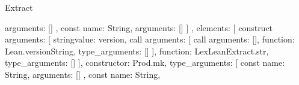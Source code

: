 \begin{lexlean}{Extract}
\begin{toolingmodule}
{{{{{{{{{{{{{{{{{{{{{{                                                                      arguments: []
                                                                    },
                                                                    const{
                                                                      name: String,
                                                                      arguments: []
                                                                    }
                                                                  ]
                                                                },
                                                                elements: [
                                                                  construct{
                                                                    arguments: [
                                                                      string{value: version},
                                                                      call{
                                                                        arguments: [
                                                                          call{
                                                                            arguments: [],
                                                                            function: Lean.versionString,
                                                                            type_arguments: []
                                                                          }
                                                                        ],
                                                                        function: LexLeanExtract.str,
                                                                        type_arguments: []
                                                                      }
                                                                    ],
                                                                    constructor: Prod.mk,
                                                                    type_arguments: [
                                                                      const{
                                                                        name: String,
                                                                        arguments: []
                                                                      },
                                                                      const{
                                                                        name: String,
}}}}}}}}}}}}}}}}}}}}}}
\end{toolingmodule}
\end{lexlean}
